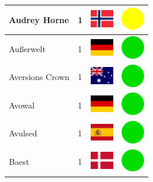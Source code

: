 \documentclass[12pt, a4paper, twoside]{report}
\begin{document}
\begin{center}
\begin{longtable}{|p{5cm}|p{2cm}|p{2cm}|p{2cm}|}
			Audrey Horne & 1 & \includegraphics[width=1cm]{4x3/no} & \includegraphics[width=1cm]{likes/m} \\ \hline
			Außerwelt & 1 & \includegraphics[width=1cm]{4x3/de} & \includegraphics[width=1cm]{likes/y} \\ \hline
			Aversions Crown & 1 & \includegraphics[width=1cm]{4x3/au} & \includegraphics[width=1cm]{likes/y} \\ \hline
			Avowal & 1 & \includegraphics[width=1cm]{4x3/de} & \includegraphics[width=1cm]{likes/y} \\ \hline
			Avulsed & 1 & \includegraphics[width=1cm]{4x3/es} & \includegraphics[width=1cm]{likes/y} \\ \hline
			Baest & 1 & \includegraphics[width=1cm]{4x3/dk} & \includegraphics[width=1cm]{likes/y} \\ \hline

\end{longtable}
\end{center}
\end{document}

